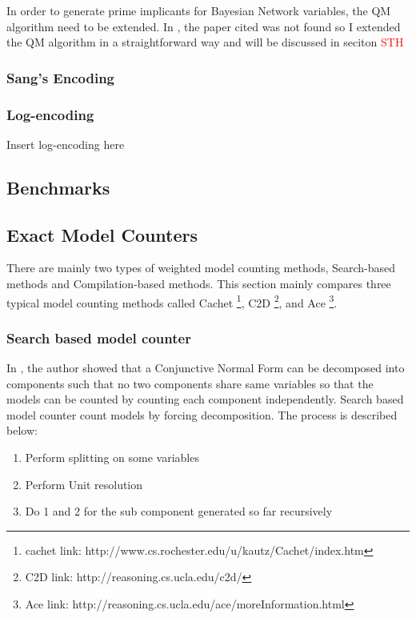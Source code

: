         In order to generate prime implicants for Bayesian Network variables, the QM algorithm need to be extended. In \cite{2006-enc3}, the paper cited was not found so I extended the QM algorithm in a straightforward way and will be discussed in seciton \textcolor{red}{STH}
        
        \subsubsection{Sang's Encoding}
        \cite{Sang:2005:PBI:1619332.1619409}
        \subsubsection{Log-encoding}
        \cite{2016-logencoding}
        Insert log-encoding here
        
        
    \subsection{Benchmarks}
    
    \subsection{Exact Model Counters}
    There are mainly two types of weighted model counting methods, Search-based methods and Compilation-based methods. This section mainly compares three typical model counting methods called Cachet \footnote{cachet link: http://www.cs.rochester.edu/u/kautz/Cachet/index.htm}, C2D \footnote{C2D link: http://reasoning.cs.ucla.edu/c2d/}, and Ace \footnote{Ace link: http://reasoning.cs.ucla.edu/ace/moreInformation.html}.
    \subsubsection{Search based model counter}
    In \cite{Bayardo:2000:CMU:647288.721114}, the author showed that a Conjunctive Normal Form can be decomposed into components such that no two components share same variables
    so that the models can be counted by counting each component independently.
    Search based model counter count models by forcing decomposition. The process is described below:
    \begin{enumerate}
        \item Perform splitting on some variables
        \item Perform Unit resolution
        \item Do 1 and 2 for the sub component generated so far recursively 
    \end{enumerate}

